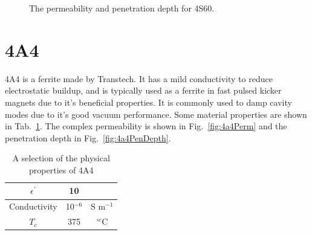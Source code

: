 \begin{figure}
\caption{The permeability  and penetration depth  for 4S60.}
\end{figure}

\section{4A4}

4A4 is a ferrite made by Transtech. It has a mild conductivity to reduce electrostatic buildup, and is typically used as a ferrite in fast pulsed kicker magnets due to it's beneficial properties. It is commonly used to damp cavity modes due to it's good vacuum performance. Some material properties are shown in Tab.~\ref{tab:4a4Prop}. The complex permeability is shown in Fig.~\ref{fig:4a4Perm} and the penetration depth in Fig.~\ref{fig:4a4PenDepth}.


\begin{table}
\caption{A selection of the physical properties of 4A4}
\label{tab:4a4Prop}
\begin{center}
\begin{tabular}{c | c | c}
$\epsilon^{'}$ & 10 & \\ \hline
Conductivity  & 10$^{-6}$ & S m$^{-1}$\\ \hline
$T_{c}$ & 375 & $^{\circ c}$C \\
\end{tabular}
\end{center}
\end{table}


